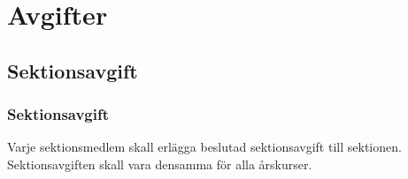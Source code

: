 \section{Avgifter}

\subsection{Sektionsavgift}

\subsubsection{Sektionsavgift}
Varje sektionsmedlem skall erlägga beslutad sektionsavgift till sektionen. Sektionsavgiften skall vara densamma för alla årskurser.